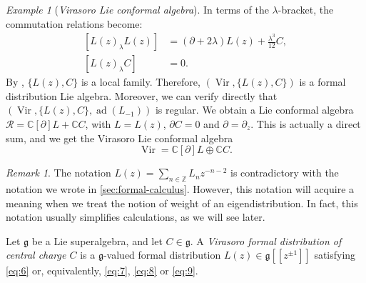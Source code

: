\documentclass[a4paper, 12pt, reqno]{amsart}
\theoremstyle{remark}
\newtheorem{remark}[theorem]{Remark}
\newtheorem{example}[theorem]{Example}
\DeclareMathOperator{\Vir}{Vir}
\DeclareMathOperator{\ad}{ad}
\begin{document}
\begin{example}[\emph{Virasoro Lie conformal algebra}]
  In terms of the $\lambda$-bracket, the commutation relations become:
  \begin{equation}
    \label{eq:9}
    \begin{split}
      [L(z)_{\lambda}L(z)] &= (\partial + 2\lambda)L(z) + \frac{\lambda^3}{12}C, \\
      [L(z)_{\lambda}C] &= 0.
    \end{split}
  \end{equation}
  By , $\{L(z), C\}$ is a local family.
  Therefore, $(\Vir, \{L(z), C\})$ is a formal distribution Lie algebra.
  Moreover, we can verify directly that $(\Vir, \{L(z), C\}, \ad(L_{-1}))$ is regular.
  We obtain a Lie conformal algebra $\mathcal{R} = \mathbb{C}[\partial]L + \mathbb{C}C$, with $L = L(z)$, $\partial C = 0$ and $\partial = \partial_z$.
  This is actually a direct sum, and we get the Virasoro Lie conformal algebra
  \begin{equation*}
    \Vir = \mathbb{C}[\partial]L \oplus \mathbb{C}C.
  \end{equation*}
\end{example}

\begin{remark}
  \label{rmk:8}
  The notation $L(z) = \sum_{n \in \mathbb{Z}}L_nz^{-n - 2}$ is contradictory with the notation we wrote in \cref{sec:formal-calculus}.
  However, this notation will acquire a meaning when we treat the notion of weight of an eigendistribution.
  In fact, this notation usually simplifies calculations, as we will see later.
\end{remark}

Let $\mathfrak{g}$ be a Lie superalgebra, and let $C \in \mathfrak{g}$.
A \emph{Virasoro formal distribution of central charge $C$} is a $\mathfrak{g}$-valued formal distribution $L(z) \in \mathfrak{g}[[z^{\pm 1}]]$ satisfying \eqref{eq:6} or, equivalently, \eqref{eq:7}, \eqref{eq:8} or \eqref{eq:9}.
\end{document}
